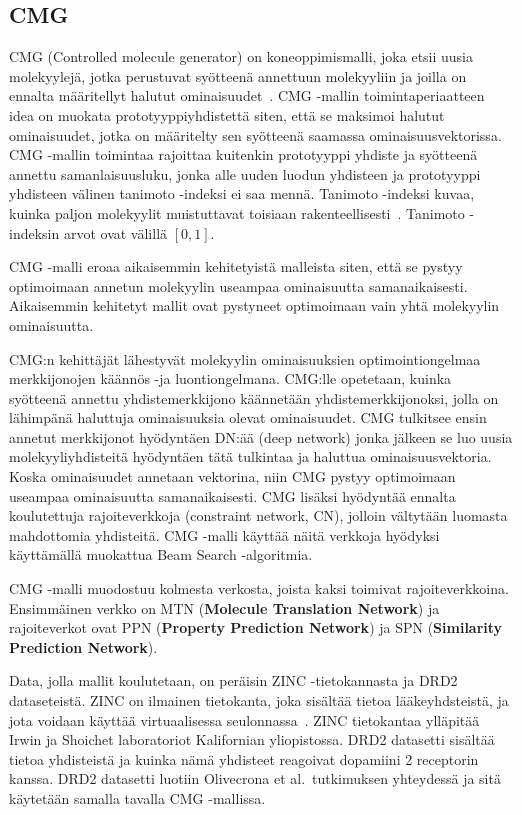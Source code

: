 \documentclass[finnish,twoside,censored,tkt,sw-line]{HYthesisML}
\begin{document}
\subsection{CMG}

CMG (Controlled molecule generator) on koneoppimismalli, joka etsii uusia molekyylejä, jotka perustuvat syötteenä annettuun molekyyliin ja joilla on ennalta määritellyt halutut ominaisuudet~\cite{ShinBonggun}.
CMG -mallin toimintaperiaatteen idea on muokata prototyyppiyhdistettä siten, että se maksimoi halutut ominaisuudet, jotka on määritelty sen syötteenä saamassa ominaisuusvektorissa.
CMG -mallin toimintaa rajoittaa kuitenkin prototyyppi yhdiste ja syötteenä annettu samanlaisuusluku, jonka alle uuden luodun yhdisteen ja prototyyppi yhdisteen välinen tanimoto -indeksi ei saa mennä.
Tanimoto -indeksi kuvaa, kuinka paljon molekyylit muistuttavat toisiaan rakenteellisesti~\cite{MaggioraGerald2014Msim}.
Tanimoto -indeksin arvot ovat välillä \([0,1]\).

CMG -malli eroaa aikaisemmin kehitetyistä malleista siten, että se pystyy optimoimaan annetun molekyylin useampaa ominaisuutta samanaikaisesti.
Aikaisemmin kehitetyt mallit ovat pystyneet optimoimaan vain yhtä molekyylin ominaisuutta.

CMG:n kehittäjät lähestyvät molekyylin ominaisuuksien optimointiongelmaa merkkijonojen käännös -ja luontiongelmana.
CMG:lle opetetaan, kuinka syötteenä annettu yhdistemerkkijono käännetään yhdistemerkkijonoksi, jolla on lähimpänä haluttuja ominaisuuksia olevat ominaisuudet.
CMG tulkitsee ensin annetut merkkijonot hyödyntäen DN:ää (deep network) jonka jälkeen se luo uusia molekyyliyhdisteitä hyödyntäen tätä tulkintaa ja haluttua ominaisuusvektoria.
Koska ominaisuudet annetaan vektorina, niin CMG pystyy optimoimaan useampaa ominaisuutta samanaikaisesti.
CMG lisäksi hyödyntää ennalta koulutettuja rajoiteverkkoja (constraint network, CN), jolloin vältytään luomasta mahdottomia yhdisteitä.
CMG -malli käyttää näitä verkkoja hyödyksi käyttämällä muokattua Beam Search -algoritmia.

CMG -malli muodostuu kolmesta verkosta, joista kaksi toimivat rajoiteverkkoina.
Ensimmäinen verkko on MTN (\textbf{Molecule Translation Network}) ja rajoiteverkot ovat PPN (\textbf{Property Prediction Network}) ja SPN (\textbf{Similarity Prediction Network}).

Data, jolla mallit koulutetaan, on peräisin ZINC -tietokannasta ja DRD2 dataseteistä.
ZINC on ilmainen tietokanta, joka sisältää tietoa lääkeyhdsteistä, ja jota voidaan käyttää virtuaalisessa seulonnassa~\cite{ZINC}.
ZINC tietokantaa ylläpitää Irwin ja Shoichet laboratoriot Kalifornian yliopistossa.
DRD2 datasetti sisältää tietoa yhdisteistä ja kuinka nämä yhdisteet reagoivat dopamiini 2 receptorin kanssa.
DRD2 datasetti luotiin Olivecrona et al.\ tutkimuksen yhteydessä ja sitä käytetään samalla tavalla CMG -mallissa.
\end{document}
